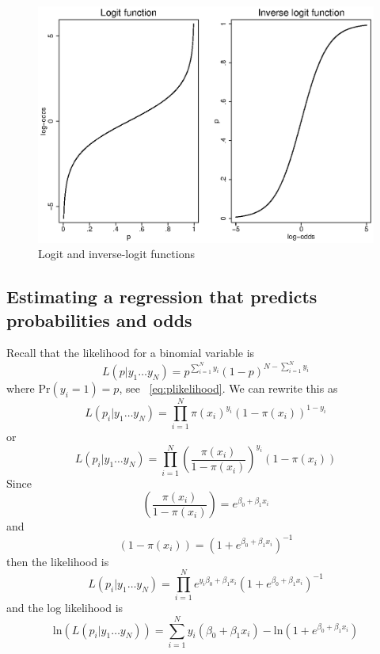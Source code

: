 \begin{figure}
   \centering
   \includegraphics[angle=0,
           width=.75\textwidth]{logitfunction.eps}
   \caption{Logit and inverse-logit functions}
  \label{fig:logitfunction}
\end{figure}

\subsection{Estimating a regression that predicts probabilities and odds}
Recall that the likelihood for a binomial variable is
\[
L\left(p \vert y_1 \ldots y_N\right)=p^{\sum_{i=1}^Ny_i}\left(1-p\right)^{N-\sum_{i=1}^Ny_i}
\]
where $\mbox{Pr}\left(y_i = 1\right) = p$, see ~\eqref{eq:plikelihood}. We can rewrite this as
\begin{equation}
L\left(p_i \vert y_1 \ldots y_N\right)=\prod_{i=1}^N\pi\left(x_i\right)^{y_i}\left(1-\pi\left(x_i\right)\right)^{1-y_i}
\end{equation}
or
\begin{equation}
L\left(p_i \vert y_1 \ldots y_N\right)=\prod_{i=1}^N \left(\frac{\pi\left(x_i\right)}{1-\pi\left(x_i\right)}\right)^{y_i}\left(1-\pi\left(x_i\right)\right)
\end{equation}
Since
\[
\left(\frac{\pi\left(x_i\right)}{1-\pi\left(x_i\right)}\right)=e^{\beta_0+\beta_1x_i}
\]
and
\[
\left(1-\pi\left(x_i\right)\right) = \left(1+e^{\beta_0+\beta_1x_i}\right)^{-1}
\]
then the likelihood is
\begin{equation}
L\left(p_i \vert y_1 \ldots y_N\right)=\prod_{i=1}^N e^{y_i\beta_0+\beta_1x_i}\left(1+e^{\beta_0+\beta_1x_i}\right)^{-1}
\end{equation}
and the log likelihood is
\begin{equation}
\mbox{ln}\left(L\left(p_i \vert y_1 \ldots y_N\right)\right)=\sum_{i=1}^N y_i\left(\beta_0+\beta_1x_i\right)-\mbox{ln}\left(1+e^{\beta_0+\beta_1x_i}\right)
\end{equation}

